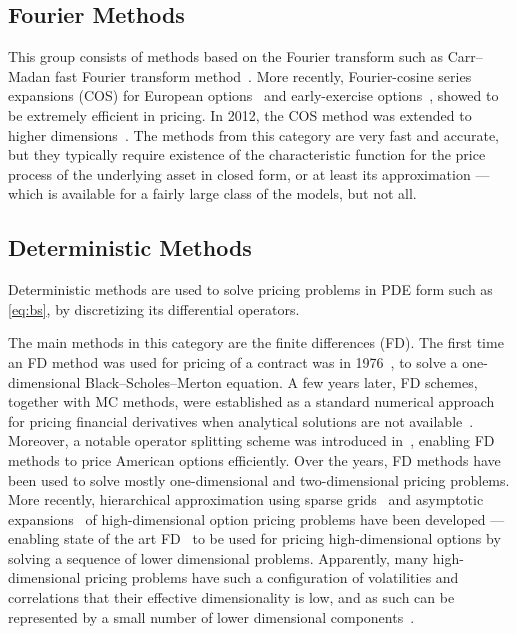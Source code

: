 \documentclass{UUThesisTemplate}
\begin{document}
%
\subsection{Fourier Methods}

\par
This group consists of methods based on the Fourier transform such as Carr--Madan fast Fourier transform method~\cite{carr1999option}. More recently, Fourier-cosine series expansions (COS) for European options~\cite{fang2008novel} and early-exercise options~\cite{fang2009pricing}, showed to be extremely efficient in pricing. In 2012, the COS method was extended to higher dimensions~\cite{ruijter2012two}. The methods from this category are very fast and accurate, but they typically require existence of the characteristic function for the price process of the underlying asset in closed form, or at least its approximation --- which is available for a fairly large class of the models, but not all. 
%



%
\subsection{Deterministic Methods}

\par
Deterministic methods are used to solve pricing problems in PDE form such as \eqref{eq:bs}, by discretizing its differential operators. 

\par
The main methods in this category are the finite differences (FD). The first time an FD method was used for pricing of a contract was in 1976~\cite{brennan1976pricing}, to solve a one-dimensional Black--Scholes--Merton equation. A few years later, FD schemes, together with MC methods, were established as a standard numerical approach for pricing financial derivatives when analytical solutions are not available~\cite{brennan1978finite}. Moreover, a notable operator splitting scheme was introduced in~\cite{ikonen2004operator}, enabling FD methods to price American options efficiently. Over the years, FD methods have been used to solve mostly one-dimensional and two-dimensional pricing problems. More recently, hierarchical approximation using sparse grids~\cite{reisinger2007efficient} and asymptotic expansions~\cite{reisinger2015numerical} of high-dimensional option pricing problems have been developed --- enabling state of the art FD~\cite{foulon2010adi, haentjens2012adi} to be used for pricing high-dimensional options by solving a sequence of lower dimensional problems. Apparently, many high-dimensional pricing problems have such a configuration of volatilities and correlations that their effective dimensionality is low, and as such can be represented by a small number of lower dimensional components~\cite{wang2005high}.
\end{document}
